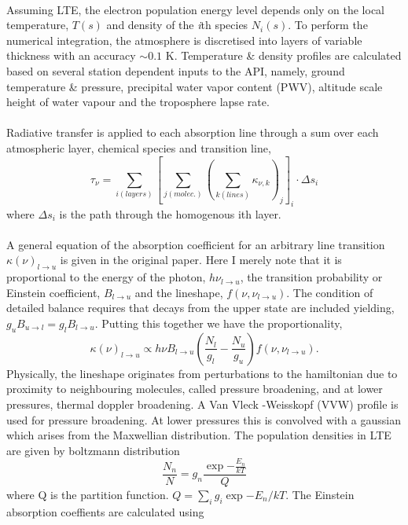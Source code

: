 ~\\
Assuming LTE, the electron population energy level  depends only on the local temperature, $T(s)$ and density of the \emph{i}th species $N_i(s)$. To perform the numerical integration, the atmosphere is discretised into layers of variable thickness with an accuracy $\sim0.1$ K. Temperature \& density profiles are calculated based on several station dependent inputs to the API, namely, ground temperature \& pressure, precipital water vapor content (PWV), altitude scale height of water vapour and the troposphere lapse rate.\\
~\\
Radiative transfer is applied to each absorption line through a sum over each atmospheric layer, chemical species and transition line, 
\begin{equation}
\tau_\nu = \sum_{i(layers)} \left[ \sum_{j(molec.)} \left( \sum_{k(lines)} \kappa_{\nu, k} \right)_j \right]_i \cdot \Delta s_i
\end{equation}
where $\Delta s_i$ is the path through the homogenous ith layer.\\
~\\
A general equation of the absorption coefficient for an arbitrary line transition $\kappa(\nu) _{l \to u}$ is given in the original paper. Here I merely note that it is proportional to the energy of the photon, $h\nu_{l \to u}$, the transition probability or Einstein coefficient, $ B_{l \to u}$ and the lineshape, $f(\nu,\nu_{l \to u})$. The condition of detailed balance requires that decays from the upper state are included yielding, $g_u B_{u \to l} =g_l B_{l \to u}$. Putting this together we have the proportionality,
\begin{equation}
\kappa(\nu) _{l \to u} \propto h\nu  B_{l \to u}  \left(\frac{N_l}{g_l}  -  \frac{N_u}{g_u} \right) f(\nu,\nu_{l \to u}).
\end{equation}
Physically, the lineshape originates from perturbations to the hamiltonian due to proximity to neighbouring molecules, called pressure broadening, and at lower pressures, thermal doppler broadening. A Van Vleck -Weisskopf (VVW) profile is used for pressure broadening. At lower pressures this is convolved with a gaussian which arises from the Maxwellian distribution. The population densities in LTE are given by boltzmann distribution
\begin{equation}
\frac{N_n}{N} = g_n \frac {\exp{-\frac{E_n}{kT}}}{Q}
\end{equation}
where Q is the partition function. $Q = \sum_i g_i  \exp{-E_n/kT}$. The Einstein absorption coeffients are calculated using 
